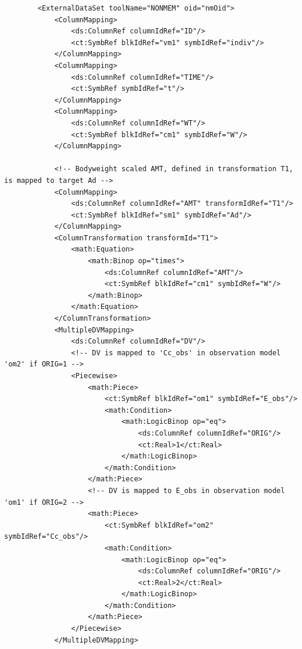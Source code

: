 \lstset{language=XML}
\begin{lstlisting}
        <ExternalDataSet toolName="NONMEM" oid="nmOid">
            <ColumnMapping>
                <ds:ColumnRef columnIdRef="ID"/>
                <ct:SymbRef blkIdRef="vm1" symbIdRef="indiv"/>
            </ColumnMapping>
            <ColumnMapping>
                <ds:ColumnRef columnIdRef="TIME"/>
                <ct:SymbRef symbIdRef="t"/>
            </ColumnMapping>
            <ColumnMapping>
                <ds:ColumnRef columnIdRef="WT"/>
                <ct:SymbRef blkIdRef="cm1" symbIdRef="W"/>
            </ColumnMapping>
            
            <!-- Bodyweight scaled AMT, defined in transformation T1, is mapped to target Ad -->
            <ColumnMapping>
                <ds:ColumnRef columnIdRef="AMT" transformIdRef="T1"/>
                <ct:SymbRef blkIdRef="sm1" symbIdRef="Ad"/>
            </ColumnMapping>
            <ColumnTransformation transformId="T1">
                <math:Equation>
                    <math:Binop op="times">
                        <ds:ColumnRef columnIdRef="AMT"/>
                        <ct:SymbRef blkIdRef="cm1" symbIdRef="W"/>
                    </math:Binop>
                </math:Equation>
            </ColumnTransformation>
            <MultipleDVMapping>
                <ds:ColumnRef columnIdRef="DV"/>
                <!-- DV is mapped to 'Cc_obs' in observation model 'om2' if ORIG=1 -->
                <Piecewise>
                    <math:Piece>
                        <ct:SymbRef blkIdRef="om1" symbIdRef="E_obs"/>
                        <math:Condition>
                            <math:LogicBinop op="eq">
                                <ds:ColumnRef columnIdRef="ORIG"/>
                                <ct:Real>1</ct:Real>
                            </math:LogicBinop>
                        </math:Condition>
                    </math:Piece>
                    <!-- DV is mapped to E_obs in observation model 'om1' if ORIG=2 -->
                    <math:Piece>
                        <ct:SymbRef blkIdRef="om2" symbIdRef="Cc_obs"/>
                        <math:Condition>
                            <math:LogicBinop op="eq">
                                <ds:ColumnRef columnIdRef="ORIG"/>
                                <ct:Real>2</ct:Real>
                            </math:LogicBinop>
                        </math:Condition>
                    </math:Piece>
                </Piecewise>
            </MultipleDVMapping>
            

\end{lstlisting}
